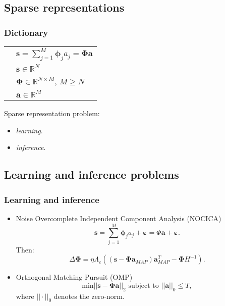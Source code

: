 \documentclass{beamer}
\newcommand{\RR}{{\mathbb{R}}}
\renewcommand{\vec}[1]{\boldsymbol{\mathbf{#1}}}
\begin{document}
\subsection{Sparse representations}
\begin{frame}
\frametitle {Dictionary}
\vspace{-5mm}
\begin{center}
\begin{table}
	\vspace{2mm}
\begin{tabular}{c l}
\vspace{2mm}
& $\vec{s}=\sum_{j=1}^{M}\vec{\phi}_j a_j=\vec{\Phi} \vec{a}$\\
\vspace{2mm}
& $\vec{s} \in \RR^N$\\
\vspace{2mm}
& $\vec{\Phi} \in \RR^{N \times M}$, $M\geq N$\\
\vspace{2mm}
& $\vec{a} \in \RR^M$\\
\end{tabular}
\end{table}
\end{center}
\vspace{1.8cm}
\pause
Sparse representation problem:
\begin{itemize}
	\item \textit{learning}.
	\item \textit{inference}.
\end{itemize}
\end{frame}
\subsection{Learning and inference problems}
\begin{frame}
	\frametitle {Learning and inference}
	\begin{itemize}
		\item Noise Overcomplete Independent Component Analysis (NOCICA)
		\begin{equation}
			\vec{s}=\sum_{j=1}^{M}\vec{\phi}_j a_j+\vec{\varepsilon}=\Phi \vec{a}+\vec{\varepsilon}.
		\end{equation}
		Then:
		\begin{equation}
			\Delta \vec{\Phi}= \eta \varLambda_{\varepsilon} ((\vec{s}-\vec{\Phi} \vec{a}_{MAP})\vec{a}_{MAP}^T-\vec{\Phi} H^{-1}).
		\end{equation}
		\pause
		\item Orthogonal Matching Pursuit (OMP)
		\begin{equation}
		\text{min} {||\vec{s}-\vec{\Phi}\vec{a}||}_{2} \text{ subject to } {||\vec{a}||}_{0}\leq T,
		\end{equation}
		where ${||\cdot||}_{0}$ denotes the zero-norm.
	\end{itemize}
\end{frame}
\end{document}
